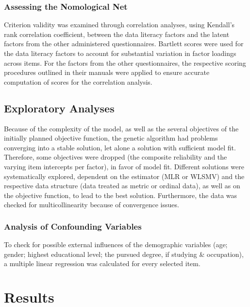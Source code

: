 \documentclass[
  12pt,
  a4paper,
  twoside]{article}
\begin{document}
\subsubsection{Assessing the Nomological Net}\label{assessing-the-nomological-net}

Criterion validity was examined through correlation analyses, using Kendall's rank correlation coefficient, between the data literacy factors and the latent factors from the other administered questionnaires. Bartlett scores were used for the data literacy factors to account for substantial variation in factor loadings across items. For the factors from the other questionnaires, the respective scoring procedures outlined in their manuals were applied to ensure accurate computation of scores for the correlation analysis.

\subsection{Exploratory Analyses}\label{exploratory-analyses}

Because of the complexity of the model, as well as the several objectives of the initially planned objective function, the genetic algorithm had problems converging into a stable solution, let alone a solution with sufficient model fit. Therefore, some objectives were dropped (the composite reliability and the varying item intercepts per factor), in favor of model fit. Different solutions were systematically explored, dependent on the estimator (MLR or WLSMV) and the respective data structure (data treated as metric or ordinal data), as well as on the objective function, to lead to the best solution. Furthermore, the data was checked for multicollinearity because of convergence issues.

\subsubsection{Analysis of Confounding Variables}\label{analysis-of-confounding-variables}

To check for possible external influences of the demographic variables (age; gender; highest educational level; the pursued degree, if studying \& occupation), a multiple linear regression was calculated for every selected item.

\section{Results}\label{results}
\end{document}

